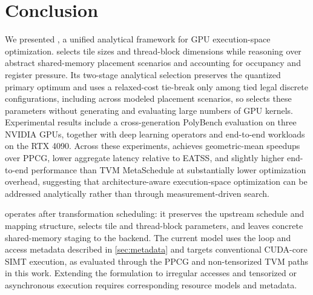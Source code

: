 \section{Conclusion}
\label{sec:conclusion}

We presented \name, a unified analytical framework for GPU execution-space optimization. \name selects tile sizes and thread-block dimensions while reasoning over abstract shared-memory placement scenarios and accounting for occupancy and register pressure. Its two-stage analytical selection preserves the quantized primary optimum and uses a relaxed-cost tie-break only among tied legal discrete configurations, including across modeled placement scenarios, so \name selects these parameters without generating and evaluating large numbers of GPU kernels. Experimental results include a cross-generation PolyBench evaluation on three NVIDIA GPUs, together with deep learning operators and end-to-end workloads on the RTX 4090. Across these experiments, \name achieves geometric-mean speedups over PPCG, lower aggregate latency relative to EATSS, and slightly higher end-to-end performance than TVM MetaSchedule at substantially lower optimization overhead, suggesting that architecture-aware execution-space optimization can be addressed analytically rather than through measurement-driven search.

\name operates after transformation scheduling: it preserves the upstream schedule and mapping structure, selects tile and thread-block parameters, and leaves concrete shared-memory staging to the backend. The current model uses the loop and access metadata described in \autoref{sec:metadata} and targets conventional CUDA-core SIMT execution, as evaluated through the PPCG and non-tensorized TVM paths in this work. Extending the formulation to irregular accesses and tensorized or asynchronous execution requires corresponding resource models and metadata.
